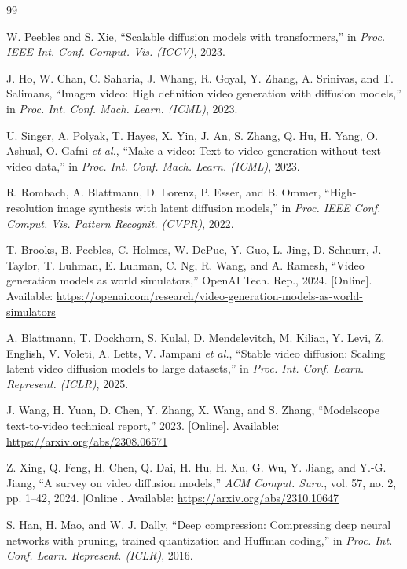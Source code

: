 \documentclass[journal,twoside]{IEEEtran}
\theoremstyle{definition}
\theoremstyle{remark}
\begin{document}
\sloppy
\begin{thebibliography}{99}

W. Peebles and S. Xie, ``Scalable diffusion models with transformers,'' in \textit{Proc. IEEE Int. Conf. Comput. Vis. (ICCV)}, 2023.

J. Ho, W. Chan, C. Saharia, J. Whang, R. Goyal, Y. Zhang, A. Srinivas, and T. Salimans, ``Imagen video: High definition video generation with diffusion models,'' in \textit{Proc. Int. Conf. Mach. Learn. (ICML)}, 2023.

U. Singer, A. Polyak, T. Hayes, X. Yin, J. An, S. Zhang, Q. Hu, H. Yang, O. Ashual, O. Gafni \textit{et al.}, ``Make-a-video: Text-to-video generation without text-video data,'' in \textit{Proc. Int. Conf. Mach. Learn. (ICML)}, 2023.

R. Rombach, A. Blattmann, D. Lorenz, P. Esser, and B. Ommer, ``High-resolution image synthesis with latent diffusion models,'' in \textit{Proc. IEEE Conf. Comput. Vis. Pattern Recognit. (CVPR)}, 2022.

T. Brooks, B. Peebles, C. Holmes, W. DePue, Y. Guo, L. Jing, D. Schnurr, J. Taylor, T. Luhman, E. Luhman, C. Ng, R. Wang, and A. Ramesh, ``Video generation models as world simulators,'' OpenAI Tech. Rep., 2024. [Online]. Available: \url{https://openai.com/research/video-generation-models-as-world-simulators}

A. Blattmann, T. Dockhorn, S. Kulal, D. Mendelevitch, M. Kilian, Y. Levi, Z. English, V. Voleti, A. Letts, V. Jampani \textit{et al.}, ``Stable video diffusion: Scaling latent video diffusion models to large datasets,'' in \textit{Proc. Int. Conf. Learn. Represent. (ICLR)}, 2025.

J. Wang, H. Yuan, D. Chen, Y. Zhang, X. Wang, and S. Zhang, ``Modelscope text-to-video technical report,'' 2023. [Online]. Available: \url{https://arxiv.org/abs/2308.06571}

Z. Xing, Q. Feng, H. Chen, Q. Dai, H. Hu, H. Xu, G. Wu, Y. Jiang, and Y.-G. Jiang, ``A survey on video diffusion models,'' \textit{ACM Comput. Surv.}, vol. 57, no. 2, pp. 1--42, 2024. [Online]. Available: \url{https://arxiv.org/abs/2310.10647}

S. Han, H. Mao, and W. J. Dally, ``Deep compression: Compressing deep neural networks with pruning, trained quantization and Huffman coding,'' in \textit{Proc. Int. Conf. Learn. Represent. (ICLR)}, 2016.


\end{thebibliography}
\end{document}
